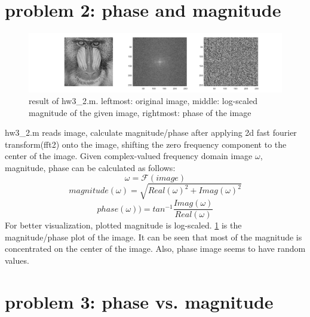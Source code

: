 \documentclass[extendedabs]{bmvc2k}
\begin{document}
\section*{problem 2: phase and magnitude}

\begin{figure}[h]
    \centering
    \includegraphics[width=\linewidth]{hw3_2_1}
    \caption{result of hw3\_2.m. leftmost: original image, middle: log-scaled magnitude
    of the given image, rightmost: phase of the image}
    \label{fig:2}
\end{figure}

hw3\_2.m reads image, calculate magnitude/phase after applying 2d fast fourier transform(fft2)
onto the image, shifting the zero frequency component to the center of the image.
Given complex-valued frequency domain image $\omega$, magnitude, phase can be calculated as follows:
\[\omega = \mathcal{F}(image)\]
\[magnitude(\omega) = \sqrt{Real(\omega)^2 + Imag(\omega)^2}\]
\[phase(\omega)) = tan^{-1}\frac{Imag(\omega)}{Real(\omega)}\]
For better visualization, plotted magnitude is log-scaled.
\figurename{\ref{fig:2}} is the magnitude/phase plot of the image.
It can be seen that most of the magnitude is concentrated on the center of the image.
Also, phase image seems to have random values.

\section*{problem 3: phase vs. magnitude}
\end{document}
